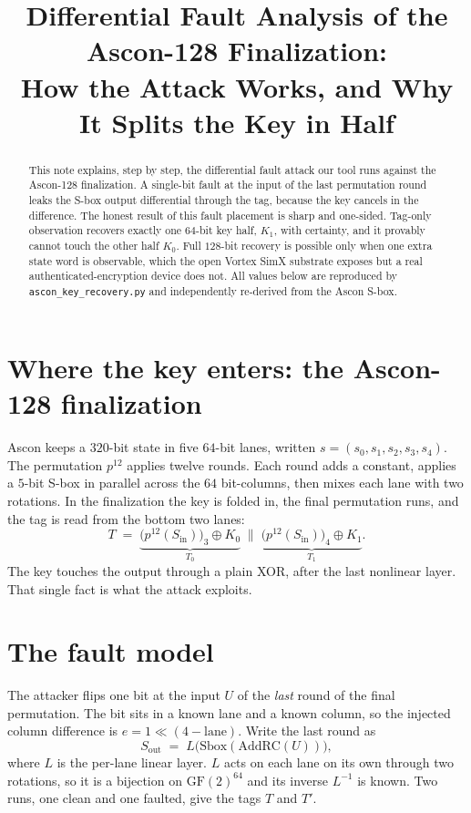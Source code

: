 \documentclass[11pt]{article}
\title{\vspace{-1.2cm}Differential Fault Analysis of the Ascon-128 Finalization:\\
How the Attack Works, and Why It Splits the Key in Half}
\author{}
\date{}
\begin{document}
\maketitle
\vspace{-1.4cm}

\begin{abstract}
\noindent
This note explains, step by step, the differential fault attack our tool runs
against the Ascon-128 finalization. A single-bit fault at the input of the last
permutation round leaks the S-box output differential through the tag, because
the key cancels in the difference. The honest result of this fault placement is
sharp and one-sided. Tag-only observation recovers exactly one $64$-bit key
half, $K_1$, with certainty, and it provably cannot touch the other half $K_0$.
Full $128$-bit recovery is possible only when one extra state word is
observable, which the open Vortex SimX substrate exposes but a real
authenticated-encryption device does not. All values below are reproduced by
\texttt{ascon\_key\_recovery.py} and independently re-derived from the Ascon
S-box.
\end{abstract}

\section{Where the key enters: the Ascon-128 finalization}
Ascon keeps a $320$-bit state in five $64$-bit lanes, written
$s = (s_0,s_1,s_2,s_3,s_4)$. The permutation $p^{12}$ applies twelve rounds.
Each round adds a constant, applies a $5$-bit S-box in parallel across the
$64$ bit-columns, then mixes each lane with two rotations. In the finalization
the key is folded in, the final permutation runs, and the tag is read from the
bottom two lanes:
\begin{equation}
T \;=\; \underbrace{\big(p^{12}(S_{\text{in}})\big)_3 \oplus K_0}_{T_0}
   \;\big\|\;
        \underbrace{\big(p^{12}(S_{\text{in}})\big)_4 \oplus K_1}_{T_1}.
\label{eq:tag}
\end{equation}
The key touches the output through a plain XOR, after the last nonlinear layer.
That single fact is what the attack exploits.

\section{The fault model}
The attacker flips one bit at the input $U$ of the \emph{last} round of the
final permutation. The bit sits in a known lane and a known column, so the
injected column difference is $e = 1 \ll (4-\text{lane})$. Write the last round
as
\begin{equation}
S_{\text{out}} \;=\; L\big(\mathrm{Sbox}(\mathrm{AddRC}(U))\big),
\label{eq:lastround}
\end{equation}
where $L$ is the per-lane linear layer. $L$ acts on each lane on its own through
two rotations, so it is a bijection on $\mathrm{GF}(2)^{64}$ and its inverse
$L^{-1}$ is known. Two runs, one clean and one faulted, give the tags $T$ and
$T'$.
\end{document}

